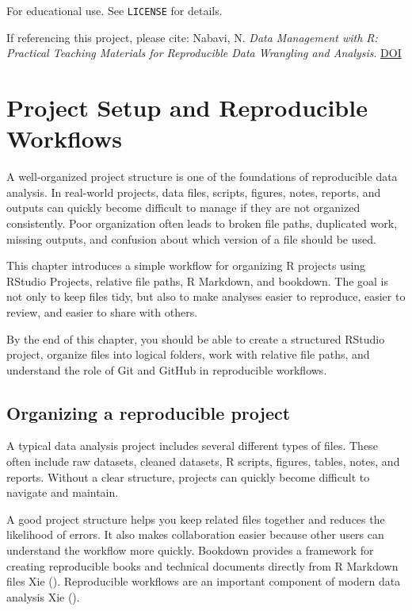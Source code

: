 \documentclass[
  11pt,
  oneside]{book}
\begin{document}
For educational use. See \texttt{LICENSE} for details.

If referencing this project, please cite: Nabavi, N. \emph{Data Management with R: Practical Teaching Materials for Reproducible Data Wrangling and Analysis}. \href{https://doi.org/10.5281/zenodo.20750322}{DOI}

\chapter{Project Setup and Reproducible Workflows}\label{project-setup-and-reproducible-workflows}

A well-organized project structure is one of the foundations of reproducible data analysis. In real-world projects, data files, scripts, figures, notes, reports, and outputs can quickly become difficult to manage if they are not organized consistently. Poor organization often leads to broken file paths, duplicated work, missing outputs, and confusion about which version of a file should be used.

This chapter introduces a simple workflow for organizing R projects using RStudio Projects, relative file paths, R Markdown, and bookdown. The goal is not only to keep files tidy, but also to make analyses easier to reproduce, easier to review, and easier to share with others.

By the end of this chapter, you should be able to create a structured RStudio project, organize files into logical folders, work with relative file paths, and understand the role of Git and GitHub in reproducible workflows.

\section{Organizing a reproducible project}\label{organizing-a-reproducible-project}

A typical data analysis project includes several different types of files. These often include raw datasets, cleaned datasets, R scripts, figures, tables, notes, and reports. Without a clear structure, projects can quickly become difficult to navigate and maintain.

A good project structure helps you keep related files together and reduces the likelihood of errors. It also makes collaboration easier because other users can understand the workflow more quickly. Bookdown provides a framework for creating reproducible books and technical documents directly from R Markdown files Xie (). Reproducible workflows are an important component of modern data analysis Xie ().
\end{document}
